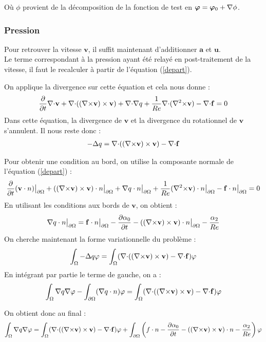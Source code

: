 Où $\phi$ provient de la décomposition de la fonction de test en $\bm{\varphi}=\bm{\varphi}_0+{\nabla}\phi$.

\subsubsection{Pression}
\label{pression}

Pour retrouver la vitesse $\mathbf{v}$, il suffit maintenant d'additionner $\mathbf{a}$ et $\mathbf{u}$.\\
Le terme correspondant à la pression ayant été relayé en post-traitement de la vitesse, il faut le recalculer à partir de l'équation (\ref{depart}).

On applique la divergence sur cette équation et cela nous donne :
\[
\frac{\partial}{\partial t}{\nabla\cdot} \mathbf{v} + {\nabla\cdot}(({\nabla\times} \mathbf{v})\times \mathbf{v}) + {\nabla\cdot}{\nabla} q + \frac{1}{Re}{\nabla\cdot}({\nabla^2\times} \mathbf{v}) - {\nabla\cdot} \mathbf{f} = 0
\]
Dans cette équation, la divergence de $\mathbf{v}$ et la divergence du rotationnel de $\mathbf{v}$ s'annulent. Il nous reste donc :
\begin{eqnarray}
\label{q}
-{\Delta} q = {\nabla\cdot}(({\nabla\times} \mathbf{v})\times \mathbf{v}) - {\nabla\cdot} \mathbf{f}
\end{eqnarray}

Pour obtenir une condition au bord, on utilise la composante normale de l'équation (\ref{depart}) :
\[
\frac{\partial}{\partial t}(\mathbf{v}\cdot n){\big\rvert_{\partial\Omega}} + (({\nabla\times} \mathbf{v})\times \mathbf{v})\cdot n{\big\rvert_{\partial\Omega}} + {\nabla} q\cdot n{\big\rvert_{\partial\Omega}} +\frac{1}{Re}({\nabla^2\times} \mathbf{v})\cdot n{\big\rvert_{\partial\Omega}} - \mathbf{f}\cdot n{\big\rvert_{\partial\Omega}} = 0
\]
En utilisant les conditions aux bords de $\mathbf{v}$, on obtient :
\[
{\nabla} q\cdot n{\big\rvert_{\partial\Omega}} =  \mathbf{f}\cdot n{\big\rvert_{\partial\Omega}} - \frac{\partial\alpha_0}{\partial t} - (({\nabla\times} \mathbf{v})\times \mathbf{v})\cdot n{\big\rvert_{\partial\Omega}} - \frac{\alpha_2}{Re}
\]
On cherche maintenant la forme variationnelle du problème :
\[
\int_\Omega -{\Delta} q\varphi = \int_\Omega ({\nabla\cdot}(({\nabla\times} \mathbf{v})\times \mathbf{v}) -{\nabla\cdot} \mathbf{f})\varphi
\]
En intégrant par partie le terme de gauche, on a :
\[
\int_\Omega {\nabla} q{\nabla}\varphi - \int_{\partial\Omega} ({\nabla} q\cdot n)\varphi = \int_\Omega ({\nabla\cdot}(({\nabla\times} \mathbf{v})\times \mathbf{v}) -{\nabla\cdot} \mathbf{f})\varphi
\]


On obtient donc au final :
\begin{eqnarray}
\label{fvq}
\int_\Omega {\nabla} q{\nabla}\varphi = \int_\Omega ({\nabla\cdot}(({\nabla\times} \mathbf{v})\times \mathbf{v}) -{\nabla\cdot} \mathbf{f})\varphi + \int_{\partial\Omega} \left(f\cdot n - \frac{\partial\alpha_0}{\partial t} - (({\nabla\times} \mathbf{v})\times \mathbf{v})\cdot n - \frac{\alpha_2}{Re}\right)\varphi
\end{eqnarray}

